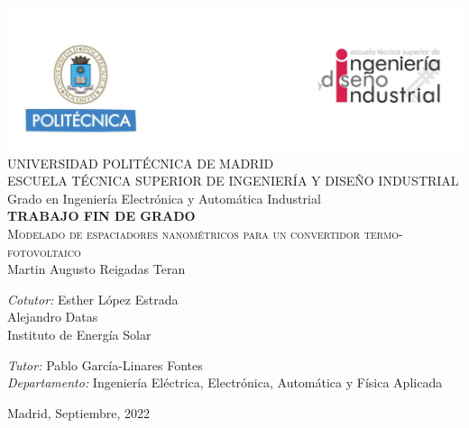 \begin{titlepage}
\begin{center}
\includegraphics[width=1\textwidth]{figuras/cabecera.png}  \\[0.5 cm]

\LARGE UNIVERSIDAD POLITÉCNICA DE MADRID \\ [1 cm]

\LARGE ESCUELA TÉCNICA SUPERIOR DE INGENIERÍA Y DISEÑO INDUSTRIAL \\ [1 cm]

\LARGE Grado en Ingeniería Electrónica y Automática Industrial\\ [1 cm]

\LARGE \textbf{TRABAJO FIN DE GRADO}\\[1 cm]

\Huge \textsc{Modelado de espaciadores nanométricos para un convertidor termo-fotovoltaico}\\[1 cm]

\LARGE Martin Augusto Reigadas Teran \\[1.8 cm]
\begin{multicols}{2} 
\begin{flushleft} \Large
\emph{Cotutor:} Esther López Estrada\\Alejandro Datas \\
Instituto de Energía Solar
\end{flushleft}

\begin{flushleft} \Large
\emph{Tutor:} Pablo García-Linares Fontes\\
\emph{Departamento:} Ingeniería Eléctrica, Electrónica, Automática y Física Aplicada
\end{flushleft}

\end{multicols} 

\vfill

{\large Madrid, Septiembre, 2022}

\cleardoublepage 
\end{center}
\end{titlepage}
